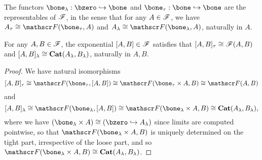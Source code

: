 \documentclass[../thesis.tex]{subfiles}
\begin{document}
%
%
%

\begin{lemma}
  The functors $\bone_\lambda : \bzero \into \bone$ and $\bone_\tau : \bone \into \bone$ are the
  representables of ${\mathscr{F}}$, in the sense that for any $A \in {\mathscr{F}}$, we have $A_\tau \cong \sF(\bone_%
  \tau, A)$ and $A_\lambda
  \cong \sF(\bone_\lambda, A)$, naturally in $A$.
\end{lemma}

\begin{corollary}
  For any $A, B \in {\mathscr{F}}$, the exponential $[A,B] \in {\mathscr{F}}$ satisfies that $[A,B]_\tau \cong {\mathscr{F}}(A,B)
  $ and $[A,B]_\lambda \cong {\mathbf{Cat}}(A_\lambda, B_\lambda)$, naturally in $A,B$.
\end{corollary}
\begin{proof}
  We have natural isomorphisms
  \[[A,B]_\tau \cong \sF(\bone_\tau, [A,B]) \cong \sF(\bone_\tau \times A, B) \cong \sF(A,B)\]
  and
  \[[A,B]_\lambda \cong \sF(\bone_\lambda, [A,B]) \cong \sF(\bone_\lambda \times A, B) \cong
  \Cat(A_\lambda, B_\lambda),\]
  where we have $(\bone_\lambda \times A) \cong (\bzero \into A_\lambda)$ since limits are computed
  pointwise, so that $\sF(\bone_\lambda \times A, B)$ is uniquely determined on the tight part,
  irrespective of the loose part, and so $\sF(\bone_\lambda \times A, B) \cong \Cat(A_\lambda, B_%
  \lambda)$.
\end{proof}
\end{document}
